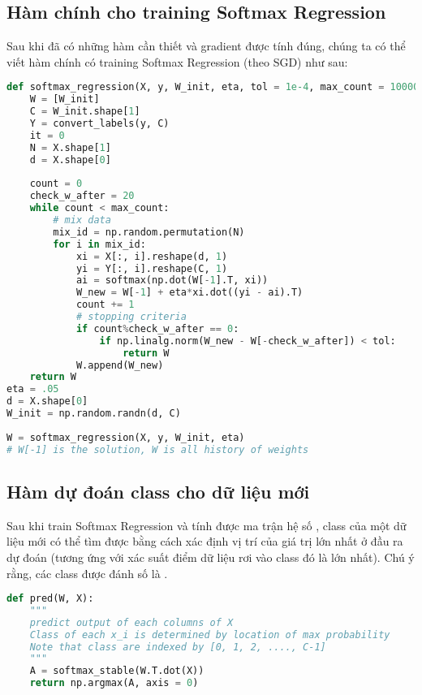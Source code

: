 \subsection{Hàm chính cho training Softmax Regression}
 
Sau khi đã có những hàm cần thiết và gradient được tính đúng, chúng ta có thể viết hàm chính có training Softmax Regression (theo SGD) như sau: 
 
\begin{lstlisting}[language=Python]
def softmax_regression(X, y, W_init, eta, tol = 1e-4, max_count = 10000): 
    W = [W_init]     
    C = W_init.shape[1] 
    Y = convert_labels(y, C) 
    it = 0 
    N = X.shape[1] 
    d = X.shape[0] 
     
    count = 0 
    check_w_after = 20 
    while count < max_count: 
        # mix data  
        mix_id = np.random.permutation(N) 
        for i in mix_id: 
            xi = X[:, i].reshape(d, 1) 
            yi = Y[:, i].reshape(C, 1) 
            ai = softmax(np.dot(W[-1].T, xi)) 
            W_new = W[-1] + eta*xi.dot((yi - ai).T) 
            count += 1 
            # stopping criteria 
            if count%check_w_after == 0:                 
                if np.linalg.norm(W_new - W[-check_w_after]) < tol: 
                    return W 
            W.append(W_new) 
    return W 
eta = .05  
d = X.shape[0] 
W_init = np.random.randn(d, C) 
 
W = softmax_regression(X, y, W_init, eta) 
# W[-1] is the solution, W is all history of weights 
\end{lstlisting}
 
 
\subsection{Hàm dự đoán class cho dữ liệu mới }
 
Sau khi train Softmax Regression và tính được ma trận hệ số , class của một dữ liệu mới có thể tìm được bằng cách xác định vị trí của giá trị lớn nhất ở đầu ra dự đoán (tương ứng với xác suất điểm dữ liệu rơi vào class đó là lớn nhất). Chú ý rằng, các class được đánh số là .  
 
\begin{lstlisting}[language=Python]
def pred(W, X): 
    """ 
    predict output of each columns of X 
    Class of each x_i is determined by location of max probability 
    Note that class are indexed by [0, 1, 2, ...., C-1] 
    """ 
    A = softmax_stable(W.T.dot(X)) 
    return np.argmax(A, axis = 0) 
\end{lstlisting}
 
